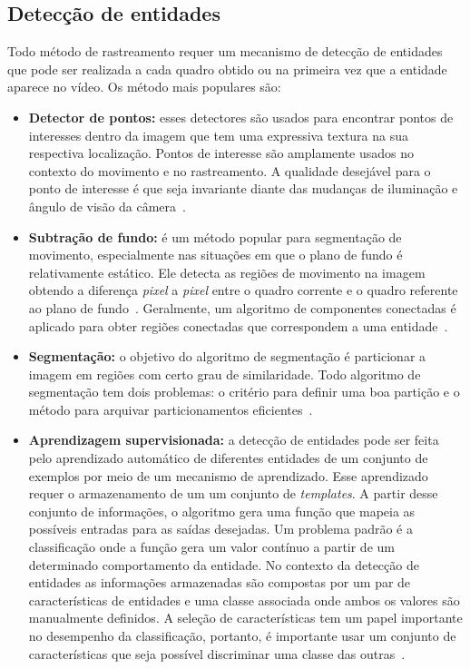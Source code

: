 \subsection{Detecção de entidades}
\label{sec:deteccao-objeto}

	Todo método de rastreamento requer um mecanismo de detecção de entidades que
	pode ser realizada a cada quadro obtido ou na primeira vez que a
	entidade aparece no vídeo. Os método mais populares são:


	\begin{itemize}
		\item \textbf{Detector de pontos:} esses detectores são usados para encontrar
		pontos de interesses dentro da imagem que tem uma expressiva textura na sua
		respectiva localização. Pontos de interesse são amplamente usados no contexto do
		movimento e no rastreamento. A qualidade desejável para o ponto de interesse é
		que seja invariante diante das mudanças de iluminação e ângulo de visão da
		câmera~\cite{yilmaz}.
			
		\item \textbf{Subtração de fundo:} é um método popular para segmentação de
		movimento, especialmente nas situações em que o plano de fundo é relativamente
		estático. Ele detecta as regiões de movimento na imagem obtendo a diferença
		\textit{pixel} a \textit{pixel} entre o quadro corrente e o
		quadro referente ao plano de fundo~\cite{weiming}. Geralmente, um
		algoritmo de componentes conectadas é aplicado para obter regiões conectadas que
		correspondem a uma entidade~\cite{yilmaz}.
		
		\item \textbf{Segmentação:} o objetivo do algoritmo de segmentação é particionar
		a imagem em regiões com certo grau de similaridade. Todo algoritmo de
		segmentação tem dois problemas: o critério para definir uma boa partição e o
		método para arquivar particionamentos eficientes~\cite{yilmaz, shi}.

		\item \textbf{Aprendizagem supervisionada:} a detecção de entidades pode ser
		feita pelo aprendizado automático de diferentes entidades de um conjunto de
		exemplos por meio de um mecanismo de aprendizado. Esse aprendizado requer o
		armazenamento de um um conjunto de \textit{templates}. A partir desse conjunto
		de informações, o algoritmo gera uma função que mapeia as possíveis entradas
		para as saídas desejadas. Um problema padrão é a classificação onde a função
		gera um valor contínuo a partir de um determinado comportamento da entidade. No
		contexto da detecção de entidades as informações armazenadas são compostas por
		um par de características de entidades e uma classe associada onde ambos os
		valores são manualmente definidos. A seleção de características tem um papel
		importante no desempenho da classificação, portanto, é importante usar um
		conjunto de características que seja possível discriminar uma classe das
		outras~\cite{yilmaz}.
	\end{itemize}

